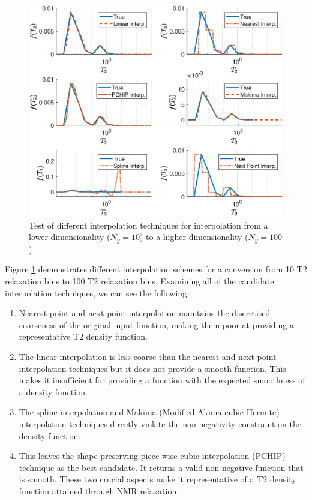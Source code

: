 \begin{figure} [h]
    \centering
    \includegraphics[width=\textwidth]{design/interpolation_choice.eps}
    \caption{Test of different interpolation techniques for interpolation from a lower dimensionality ($N_y = 10$) to a higher dimensionality ($N_y = 100$)}
    \label{fig:interpolation_comparison}
\end{figure}

Figure \ref{fig:interpolation_comparison} demonstrates different interpolation schemes for a conversion from 10 T2 relaxation bins to 100 T2 relaxation bins. Examining all of the candidate interpolation techniques, we can see the following:

\begin{enumerate}
    \item Nearest point and next point interpolation maintains the discretised coarseness of the original input function, making them poor at providing a representative T2 density function.
    \item The linear interpolation is less coarse than the nearest and next point interpolation techniques but it does not provide a smooth function. This makes it insufficient for providing a function with the expected smoothness of a density function.
    \item The spline interpolation \cite{cubicInterpolationMethods} and Makima (Modified Akima cubic Hermite) interpolation techniques \cite{akimaInterpolation} directly violate the non-negativity constraint on the density function.
    \item This leaves the shape-preserving piece-wise cubic interpolation (PCHIP) technique \cite{fritsch1980monotone} as the best candidate. It returns a valid non-negative function that is smooth. These two crucial aspects make it representative of a T2 density function attained through NMR relaxation.
\end{enumerate}

